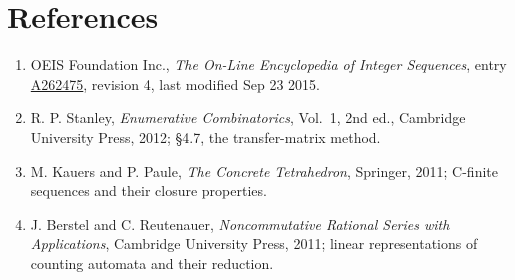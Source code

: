 \documentclass[11pt]{article}
\theoremstyle{definition}
\begin{document}
\section{References}

\begin{enumerate}

\item OEIS Foundation Inc., \emph{The On-Line Encyclopedia of Integer Sequences}, entry \href{https://oeis.org/A262475}{A262475}, revision 4, last modified Sep 23 2015.

\item R. P. Stanley, \emph{Enumerative Combinatorics}, Vol.~1, 2nd ed., Cambridge University Press, 2012; \S4.7, the transfer-matrix method.

\item M. Kauers and P. Paule, \emph{The Concrete Tetrahedron}, Springer, 2011; C-finite sequences and their closure properties.

\item J. Berstel and C. Reutenauer, \emph{Noncommutative Rational Series with Applications}, Cambridge University Press, 2011; linear representations of counting automata and their reduction.

\end{enumerate}
\end{document}

